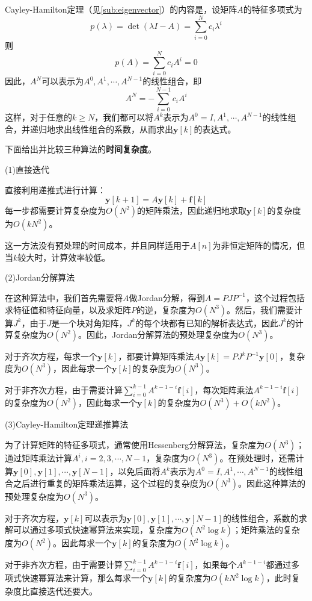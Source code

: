 Cayley-Hamilton定理（见\ref{sub:eigenvector}）的内容是，设矩阵$A$的特征多项式为
$$p(\lambda)=\det(\lambda I - A)=\sum_{i=0}^{N} c_i \lambda^i$$
则
$$p(A)=\sum_{i=0}^{N} c_i A^i=0$$
因此，$A^N$可以表示为$A^0,A^1,\cdots,A^{N-1}$的线性组合，即
$$A^N = -\sum_{i=0}^{N-1} c_i A^i$$
这样，对于任意的$k\geq N$，我们都可以将$A^k$表示为$A^0=I,A^1,\cdots,A^{N-1}$的线性组合，并递归地求出线性组合的系数，从而求出$\mathbf{y}[k]$的表达式。

下面给出并比较三种算法的\textbf{时间复杂度}。

(1)直接迭代

直接利用递推式进行计算：
$$\mathbf{y}[k+1] = A \mathbf{y}[k] + \mathbf{f}[k]$$
每一步都需要计算复杂度为$O(N^2)$的矩阵乘法，因此递归地求取$\mathbf{y}[k]$的复杂度为$O(k N^2)$。

这一方法没有预处理的时间成本，并且同样适用于$A[n]$为非恒定矩阵的情况，但当$k$较大时，计算效率较低。

(2)Jordan分解算法

在这种算法中，我们首先需要将$A$做Jordan分解，得到$A=PJP^{-1}$，这个过程包括求特征值和特征向量，以及求矩阵$P$的逆，复杂度为$O(N^3)$。然后，我们需要计算$J^k$，由于$J$是一个块对角矩阵，$J^k$的每个块都有已知的解析表达式，因此$J^k$的计算复杂度为$O(N^2)$。因此，Jordan分解算法的预处理复杂度为$O(N^3)$。

对于齐次方程，每求一个$\mathbf{y}[k]$，都要计算矩阵乘法$A\mathbf{y}[k] = P J^k P^{-1} \mathbf{y}[0]$，复杂度为$O(N^3)$，因此每求一个$\mathbf{y}[k]$的复杂度为$O(N^3)$。

对于非齐次方程，由于需要计算$\sum_{i=0}^{k-1} A^{k-1-i} \mathbf{f}[i]$，每次矩阵乘法$A^{k-1-i} \mathbf{f}[i]$的复杂度为$O(N^2)$，因此每求一个$\mathbf{y}[k]$的复杂度为$O(N^3)+O(k N^2)$。

(3)Cayley-Hamilton定理递推算法

为了计算矩阵的特征多项式，通常使用Hessenberg分解算法，复杂度为$O(N^3)$；通过矩阵乘法计算$A^i,i=2,3,\cdots,N-1$，复杂度为$O(N^3)$。在预处理时，还需计算$\mathbf{y}[0],\mathbf{y}[1],\cdots,\mathbf{y}[N-1]$，以免后面将$A^k$表示为$A^0=I,A^1,\cdots,A^{N-1}$的线性组合之后进行重复的矩阵乘法运算，这个过程的复杂度为$O(N^3)$。因此这种算法的预处理复杂度为$O(N^3)$。

对于齐次方程，$\mathbf{y}[k]$可以表示为$\mathbf{y}[0],\mathbf{y}[1],\cdots,\mathbf{y}[N-1]$的线性组合，系数的求解可以通过多项式快速幂算法来实现，复杂度为$O(N^2 \log k)$；矩阵乘法的复杂度为$O(N^2)$。因此每求一个$\mathbf{y}[k]$的复杂度为$O(N^2 \log k)$。

对于非齐次方程，由于需要计算$\sum_{i=0}^{k-1} A^{k-1-i} \mathbf{f}[i]$，如果每个$A^{k-1-i}$都通过多项式快速幂算法来计算，那么每求一个$\mathbf{y}[k]$的复杂度为$O(k N^2 \log k)$，此时复杂度比直接迭代还要大。

